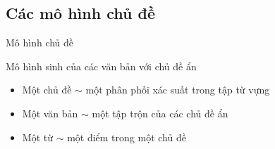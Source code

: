 \documentclass[pdf]{beamer}
\begin{document}
%

\subsection{Các mô hình chủ đề}
\begin{frame}{Mô hình chủ đề}
\begin{figure}
\end{figure}
Mô hình sinh của các văn bản với chủ đề ẩn
\begin{itemize}
	\item Một chủ đề $\sim$ một phân phối xác suất trong tập từ vựng
	\item Một văn bản $\sim$ một tập trộn của các chủ đề ẩn
	\item Một từ $\sim$ một điểm trong một chủ đề
\end{itemize}	
\end{frame}
\end{document}
